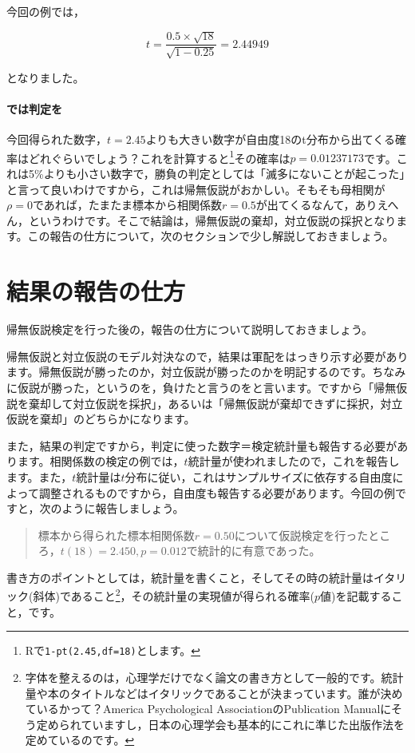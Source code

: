 \documentclass{ltjsarticle}
\begin{document}
今回の例では，

$$ t = \frac{0.5 \times \sqrt{18}}{\sqrt{1-0.25}} = 2.44949 $$

となりました。

\paragraph{では判定を}

今回得られた数字，$t=2.45$よりも大きい数字が自由度18のt分布から出てくる確率はどれぐらいでしょう？これを計算すると\footnote{Rで\texttt{1-pt(2.45,df=18)}とします。}その確率は$p=0.01237173$です。これは5\%よりも小さい数字で，勝負の判定としては「滅多にないことが起こった」と言って良いわけですから，これは帰無仮説がおかしい。そもそも母相関が$\rho=0$であれば，たまたま標本から相関係数$r=0.5$が出てくるなんて，ありえへん，というわけです。そこで結論は，帰無仮説の棄却，対立仮説の採択となります。この報告の仕方について，次のセクションで少し解説しておきましょう。

\section{結果の報告の仕方}
帰無仮説検定を行った後の，報告の仕方について説明しておきましょう。

帰無仮説と対立仮説のモデル対決なので，結果は軍配をはっきり示す必要があります。帰無仮説が勝ったのか，対立仮説が勝ったのかを明記するのです。ちなみに仮説が勝った，というのを，負けたと言うのをと言います。ですから「帰無仮説を棄却して対立仮説を採択」，あるいは「帰無仮説が棄却できずに採択，対立仮説を棄却」のどちらかになります。

また，結果の判定ですから，判定に使った数字＝検定統計量も報告する必要があります。相関係数の検定の例では，$t$統計量が使われましたので，これを報告します。また，$t$統計量は$t$分布に従い，これはサンプルサイズに依存する自由度によって調整されるものですから，自由度も報告する必要があります。今回の例ですと，次のように報告しましょう。
\begin{quote}
標本から得られた標本相関係数$r=0.50$について仮説検定を行ったところ，$t(18)=2.450,p=0.012$で統計的に有意であった。
\end{quote}
書き方のポイントとしては，統計量を書くこと，そしてその時の統計量はイタリック(斜体)であること\footnote{字体を整えるのは，心理学だけでなく論文の書き方として一般的です。統計量や本のタイトルなどはイタリックであることが決まっています。誰が決めているかって？America Psychological AssociationのPublication Manualにそう定められていますし，日本の心理学会も基本的にこれに準じた出版作法を定めているのです。}，その統計量の実現値が得られる確率($p$値)を記載すること，です。
\end{document}
